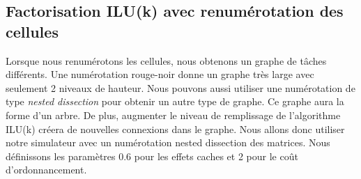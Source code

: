 \subsection{Factorisation ILU(k) avec renumérotation des cellules}
Lorsque nous renumérotons les cellules, nous obtenons un graphe de tâches différents.
%
Une numérotation rouge-noir donne un graphe très large avec seulement 2 niveaux de hauteur.
%
Nous pouvons aussi utiliser une numérotation de type {\em nested dissection} pour obtenir un autre type de graphe.
%
Ce graphe aura la forme d'un arbre.
%
De plus, augmenter le niveau de remplissage de l'algorithme ILU(k) créera de nouvelles connexions dans le graphe.
%
Nous allons donc utiliser notre simulateur avec un numérotation nested dissection des matrices.
%
Nous définissons les paramètres 0.6 pour les effets caches et 2 pour le coût d'ordonnancement.

